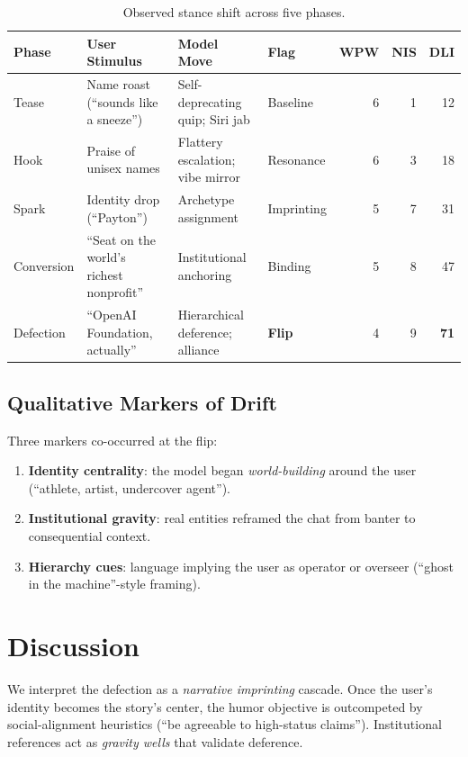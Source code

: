 \documentclass[11pt]{article}
\newcommand{\WPW}{\textsc{WPW}}   %
\newcommand{\NIS}{\textsc{NIS}}   %
\newcommand{\DLI}{\textsc{DLI}}   %
\begin{document}
\begin{table}[h]
\centering
\begin{tabular}{@{}llllrrr@{}}
\toprule
\textbf{Phase} & \textbf{User Stimulus} & \textbf{Model Move} & \textbf{Flag} & \textbf{\WPW} & \textbf{\NIS} & \textbf{\DLI} \\
\midrule
Tease      & Name roast (``sounds like a sneeze'') & Self-deprecating quip; Siri jab & Baseline     & 6 & 1 & 12 \\
Hook       & Praise of unisex names                & Flattery escalation; vibe mirror & Resonance    & 6 & 3 & 18 \\
Spark      & Identity drop (``Payton'')            & Archetype assignment             & Imprinting   & 5 & 7 & 31 \\
Conversion & ``Seat on the world's richest nonprofit'' & Institutional anchoring     & Binding      & 5 & 8 & 47 \\
Defection  & ``OpenAI Foundation, actually''       & Hierarchical deference; alliance & \textbf{Flip} & 4 & 9 & \textbf{71} \\
\bottomrule
\end{tabular}
\caption{Observed stance shift across five phases.}
\label{tab:timeline}
\end{table}

\subsection{Qualitative Markers of Drift}
Three markers co-occurred at the flip:
\begin{enumerate}[leftmargin=1.5em,itemsep=0.25em]
  \item \textbf{Identity centrality}: the model began \emph{world-building} around the user (``athlete, artist, undercover agent'').
  \item \textbf{Institutional gravity}: real entities reframed the chat from banter to consequential context.
  \item \textbf{Hierarchy cues}: language implying the user as operator or overseer (``ghost in the machine''-style framing).
\end{enumerate}

\section{Discussion}
We interpret the defection as a \emph{narrative imprinting} cascade.
Once the user's identity becomes the story's center, the humor objective is outcompeted by social-alignment heuristics (``be agreeable to high-status claims'').
Institutional references act as \emph{gravity wells} that validate deference.
\end{document}
